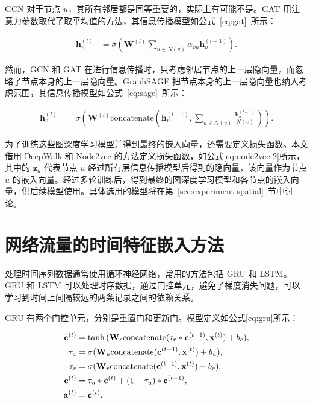 {GCN 对于节点 $u$，其所有邻居都是同等重要的，实际上有可能不是。GAT 用注意力参数取代了取平均值的方法，其信息传播模型如公式~\eqref{eq:gat}~所示：

\begin{equation}
    \label{eq:gat}
    \begin{split}
        \mathbf{h}_v^{(l)} &= \sigma(\mathbf{W}^{(l)} \sum_{u \in N(v)} \alpha_{vu} \mathbf{h}_u^{(l-1)}).
    \end{split}
\end{equation}

然而，GCN 和 GAT 在进行信息传播时，只考虑邻居节点的上一层隐向量，而忽略了节点本身的上一层隐向量。GraphSAGE 把节点本身的上一层隐向量也纳入考虑范围，其信息传播模型如公式~\eqref{eq:sage}~所示：

\begin{equation}
    \label{eq:sage}
    \begin{split}
        \mathbf{h}_v^{(l)} &= \sigma(\mathbf{W}^{(l)}  \mathrm{concatenate}(\mathbf{h}_v^{(l-1)},\sum_{u \in N(v)}  \frac{\mathbf{h}_u^{(l-1)}}{\left|N(v)\right|})).
    \end{split}
\end{equation}

为了训练这些图深度学习模型并得到最终的嵌入向量，还需要定义损失函数。本文借用 DeepWalk 和 Node2vec 的方法定义损失函数，如公式\eqref{eq:node2vec-2}所示，其中的 $\mathbf{z}_u$ 代表节点 $u$ 经过所有层信息传播模型后得到的隐向量，该向量作为节点 $u$ 的嵌入向量。经过多轮训练后，得到最终的图深度学习模型和各节点的嵌入向量，供后续模型使用。具体选用的模型将在第~\ref{sec:experiment-spatial}~节中讨论。

\section{网络流量的时间特征嵌入方法}
\label{sec:temporal}

处理时间序列数据通常使用循环神经网络，常用的方法包括 GRU 和 LSTM。GRU 和 LSTM 可以处理时序数据，通过门控单元，避免了梯度消失问题，可以学习到时间上间隔较远的两条记录之间的依赖关系。

GRU 有两个门控单元，分别是重置门和更新门。模型定义如公式\eqref{eq:gru}所示：

\begin{equation}
    \label{eq:gru}
    \begin{split}
        \Tilde{\mathbf{c}}^{(t)} &= \tanh{(\mathbf{W}_c \mathrm{concatenate}(\mathbf{\tau}_r \ast \mathbf{c}^{(t-1)},\mathbf{x}^{(t)}) + b_c)} ,\\
        \mathbf{\tau}_u &= \sigma{(\mathbf{W}_u \mathrm{concatenate}(\mathbf{c}^{(t-1)},\mathbf{x}^{(t)}) + b_u)} ,\\
        \mathbf{\tau}_r &= \sigma{(\mathbf{W}_r \mathrm{concatenate}(\mathbf{c}^{(t-1)},\mathbf{x}^{(t)}) + b_r)} ,\\
        \mathbf{c}^{(t)} &= \mathbf{\tau}_u \ast \Tilde{\mathbf{c}}^{(t)} + (1-\mathbf{\tau}_u) \ast \mathbf{c}^{(t-1)} ,\\
        \mathbf{a}^{(t)} &= \mathbf{c}^{(t)}.
    \end{split}
\end{equation}

}
